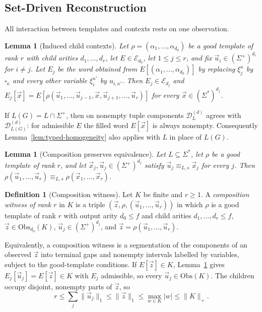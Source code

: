 \documentclass[11pt]{article}
\numberwithin{equation}{section}
\theoremstyle{plain}
\newtheorem{lemma}[theorem]{Lemma}
\theoremstyle{definition}
\newtheorem{definition}[theorem]{Definition}
\theoremstyle{remark}
\newcommand{\D}{\mathcal{D}}
\newcommand{\tuple}[1]{\vec{#1}}
\newcommand{\blank}{\square}
\theoremstyle{plain}
\begin{document}
\subsection{Set-Driven Reconstruction}

All interaction between templates and contexts rests on one observation.

\begin{lemma}[Induced child contexts]
\label{lem:filling-identity}
Let $\rho=(\alpha_1,\ldots,\alpha_{d_0})$ be a good template of rank $r$ with child
arities $d_1,\ldots,d_r$, let $E\in\mathcal E_{d_0}$, let $1\le j\le r$, and fix
$\tuple u_i\in(\Sigma^+)^{d_i}$ for $i\ne j$.  Let $E_j$ be the word obtained
from $E[(\alpha_1,\ldots,\alpha_{d_0})]$ by replacing $\xi_j^\kappa$ by
$\blank_\kappa$ and every other variable $\xi_i^{\kappa'}$ by $u_{i,\kappa'}$.  Then
$E_j\in\mathcal E_{d_j}$ and
$E_j[\tuple x]=E[\rho(\tuple u_1,\ldots,\tuple u_{j-1},\tuple x,
\tuple u_{j+1},\ldots,\tuple u_r)]$ for every
$\tuple x\in(\Sigma^*)^{d_j}$.
\end{lemma}

If $L(G)=L\cap\Sigma^+$, then on nonempty tuple components
$\D_L^{(d)}$ agrees with $\D_{L(G)}^{(d)}$: for admissible $E$
the filled word $E[\tuple x]$ is always nonempty.
Consequently Lemma~\ref{lem:typed-homogeneity} also applies with
$L$ in place of $L(G)$.


\begin{lemma}[Composition preserves equivalence]
\label{lem:witnessed-composition}
Let $L\subseteq\Sigma^*$, let $\rho$ be a good template of rank $r$, and let
$\tuple x_j,\tuple u_j\in(\Sigma^+)^{d_j}$ satisfy
$\tuple u_j\equiv_{L,s}\tuple x_j$ for every $j$.  Then
$\rho(\tuple u_1,\ldots,\tuple u_r)\equiv_{L,s}\rho(\tuple x_1,\ldots,\tuple x_r)$.
\end{lemma}

\begin{definition}[Composition witness]
\label{def:composition-witness}
Let $K$ be finite and $r\ge1$.  A \emph{composition witness of rank $r$} in $K$
is a triple $(\tuple z,\rho,(\tuple u_1,\ldots,\tuple u_r))$ in which $\rho$
is a good template of rank $r$ with output arity $d_0\le f$ and child arities
$d_1,\ldots,d_r\le f$, $\tuple z\in\mathrm{Obs}_{d_0}(K)$,
$\tuple u_j\in(\Sigma^+)^{d_j}$, and
$\tuple z=\rho(\tuple u_1,\ldots,\tuple u_r)$.
\end{definition}

Equivalently, a composition witness is a segmentation of the components of an
observed $\tuple z$ into terminal gaps and nonempty intervals labelled by
variables, subject to the good-template conditions.  If $E[\tuple z]\in K$,
Lemma~\ref{lem:filling-identity} gives $E_j[\tuple u_j]=E[\tuple z]\in K$ with
$E_j$ admissible, so every $\tuple u_j\in\mathrm{Obs}(K)$.  The children occupy
disjoint, nonempty parts of $\tuple z$, so
\begin{equation}
\label{eq:sample-rank}
 r\le\textstyle\sum_j\|\tuple u_j\|_1\le\|\tuple z\|_1\le\max_{w\in K}|w|
 \le\|K\|_+ .
\end{equation}
\end{document}

